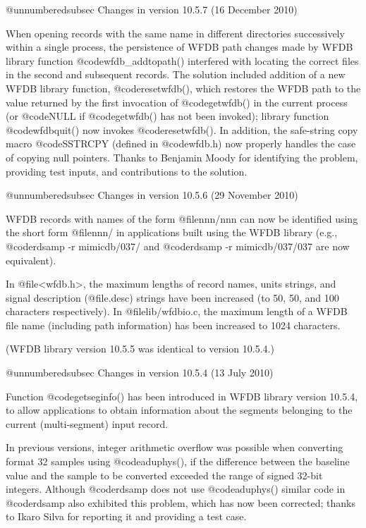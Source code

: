 {{{{{{{{@unnumberedsubsec Changes in version 10.5.7 (16 December 2010)

When opening records with the same name in different directories successively
within a single process, the persistence of WFDB path changes made by WFDB
library function @code{wfdb_addtopath()} interfered with locating the correct
files in the second and subsequent records.  The solution included addition of
a new WFDB library function, @code{resetwfdb()}, which restores the WFDB path
to the value returned by the first invocation of @code{getwfdb()} in the
current process (or @code{NULL} if @code{getwfdb()} has not been invoked);
library function @code{wfdbquit()} now invokes @code{resetwfdb()}.  In
addition, the safe-string copy macro @code{SSTRCPY} (defined in @code{wfdb.h})
now properly handles the case of copying null pointers.  Thanks to Benjamin
Moody for identifying the problem, providing test inputs, and contributions to
the solution.

@unnumberedsubsec Changes in version 10.5.6 (29 November 2010)

WFDB records with names of the form @file{nnn/nnn} can now be identified
using the short form @file{nnn/} in applications built using the WFDB library
(e.g., @code{rdsamp -r mimicdb/037/} and @code{rdsamp -r mimicdb/037/037} are
now equivalent).

In @file{<wfdb.h>}, the maximum lengths of record names, units strings, and
signal description (@file{.desc}) strings have been increased (to 50, 50,
and 100 characters respectively).  In @file{lib/wfdbio.c}, the maximum length
of a WFDB file name (including path information) has been increased to
1024 characters.

(WFDB library version 10.5.5 was identical to version 10.5.4.)

@unnumberedsubsec Changes in version 10.5.4 (13 July 2010)

Function @code{getseginfo()} has been introduced in WFDB library version
10.5.4, to allow applications to obtain information about the
segments belonging to the current (multi-segment) input record.

In previous versions, integer arithmetic overflow was possible
when converting format 32 samples using @code{aduphys()}, if the difference
between the baseline value and the sample to be converted exceeded
the range of signed 32-bit integers.  Although @code{rdsamp} does not
use @code{aduphys()} similar code in @code{rdsamp} also exhibited this problem,
which has now been corrected;  thanks to Ikaro Silva for
reporting it and providing a test case.

}}}}}}}}

